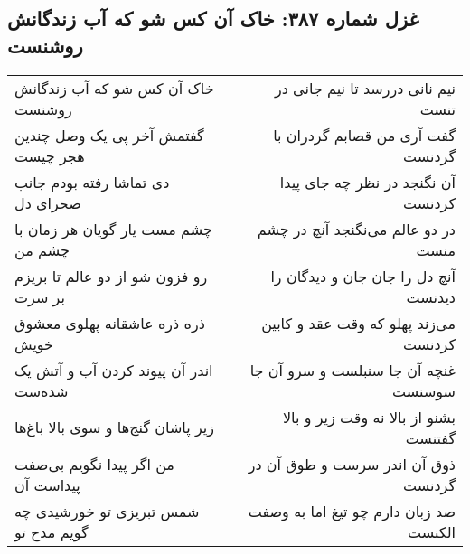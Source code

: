 \begin{center}
\section*{غزل شماره ۳۸۷: خاک آن کس شو که آب زندگانش روشنست}
\label{sec:0387}
\begin{longtable}{l p{0.5cm} r}
خاک آن کس شو که آب زندگانش روشنست
&&
نیم نانی دررسد تا نیم جانی در تنست
\\
گفتمش آخر پی یک وصل چندین هجر چیست
&&
گفت آری من قصابم گردران با گردنست
\\
دی تماشا رفته بودم جانب صحرای دل
&&
آن نگنجد در نظر چه جای پیدا کردنست
\\
چشم مست یار گویان هر زمان با چشم من
&&
در دو عالم می‌نگنجد آنچ در چشم منست
\\
رو فزون شو از دو عالم تا بریزم بر سرت
&&
آنچ دل را جان جان و دیدگان را دیدنست
\\
ذره ذره عاشقانه پهلوی معشوق خویش
&&
می‌زند پهلو که وقت عقد و کابین کردنست
\\
اندر آن پیوند کردن آب و آتش یک شده‌ست
&&
غنچه آن جا سنبلست و سرو آن جا سوسنست
\\
زیر پاشان گنج‌ها و سوی بالا باغ‌ها
&&
بشنو از بالا نه وقت زیر و بالا گفتنست
\\
من اگر پیدا نگویم بی‌صفت پیداست آن
&&
ذوق آن اندر سرست و طوق آن در گردنست
\\
شمس تبریزی تو خورشیدی چه گویم مدح تو
&&
صد زبان دارم چو تیغ اما به وصفت الکنست
\\
\end{longtable}
\end{center}
